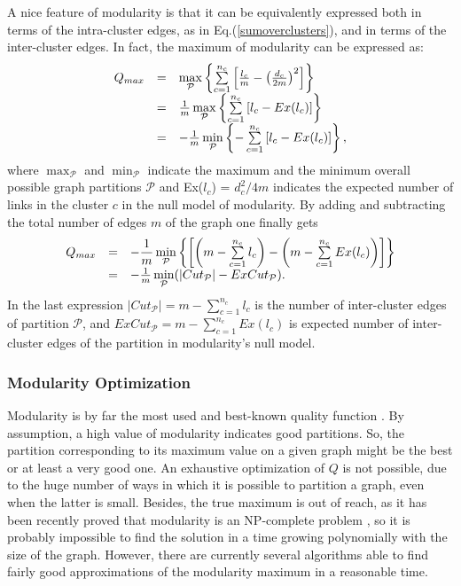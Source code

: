 {A nice feature of modularity is that it can be equivalently expressed both in terms of the intra-cluster edges, as in Eq.(\ref{sumoverclusters}), and in terms of the inter-cluster edges. In fact, the maximum of modularity can be expressed as:
\begin{equation}\label{modularity_Q_max}
\begin{array}{c c lc}
Q_{max} & = & \max\limits_{\mathcal{P}} \left\lbrace \sum\limits_{c=1}^{n_{c}}\left[\frac{l_{c}}{m} - \left(\frac{d_{c}}{2m}\right)^2\right]\right\rbrace \\
& = & \frac{1}{m}\max\limits_{\mathcal{P}} \left\lbrace \sum\limits_{c=1}^{n_{c}}\left[l_{c} - Ex(l_{c})\right] \right\rbrace \\
& = & - \frac{1}{m}\min\limits_{\mathcal{P}} \left\lbrace - \sum\limits_{c=1}^{n_{c}}\left[l_{c} - Ex(l_{c})\right] \right\rbrace,
\end{array}
\end{equation}
where $\max_{\mathcal{P}}$ and $\min_{\mathcal{P}}$ indicate the maximum and the minimum overall possible graph partitions $\mathcal{P}$ and Ex($l_c$) = $d_c^2/4m$ indicates the expected number of links in the cluster $c$ in the null model of modularity. By adding and subtracting the total number of edges $m$ of the graph one finally gets
\begin{equation}\label{modularity_Q_max_cut}
\begin{array}{c c lc}
Q_{max} & = & -\dfrac{1}{m} \min\limits_{\mathcal{P}}\left\lbrace \left[ \left( m - \sum\limits_{c=1}^{n_c} l_c\right) - \left( m - \sum\limits_{c=1}^{n_c} Ex(l_c)\right) \right] \right \rbrace \\
& = & - \frac{1}{m} \min\limits_{\mathcal{P}} (\vert Cut_{\mathcal{P}} \vert - ExCut_{\mathcal{P}}).
\end{array}
\end{equation}
In the last expression $\vert Cut_{\mathcal{P}} \vert = m - \sum_{c=1}^{n_c} l_c$ is the number of inter-cluster edges of partition $\mathcal{P}$, and $ExCut_{\mathcal{P}} = m - \sum_{c=1}^{n_c} Ex(l_c)$ is expected number of inter-cluster edges of the partition in modularity's null model.

\subsubsection*{Modularity Optimization }\label{sebsec:modularity-optimization}
Modularity is by far the most used and best-known quality function \cite{ref-6}. By assumption, a high value of modularity indicates good partitions. So, the partition corresponding to its maximum value on a given graph might be the best or at least a very good one. An exhaustive optimization of $Q$ is not possible, due to the huge number of ways in which it is possible to partition a graph, even when the latter is small. Besides, the true maximum is out of reach, as it has been recently proved that modularity is an NP-complete problem \cite{ref-18}, so it is probably impossible to find the solution in a time growing polynomially with the size of the graph. However, there are currently several algorithms able to find fairly good approximations of the modularity maximum in a reasonable time.


}
